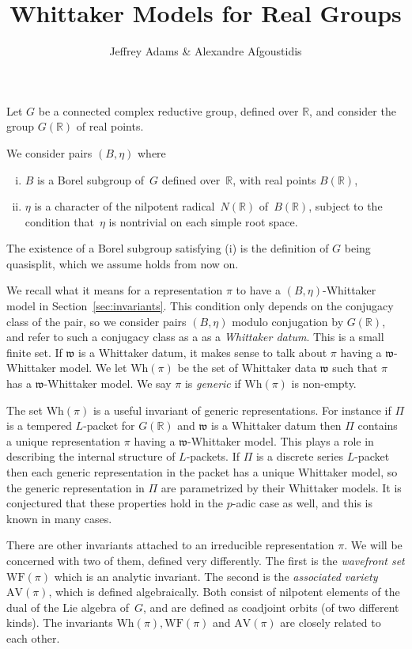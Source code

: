 \documentclass[10pt,leqno]{article}
\newcommand{\R}{\mathbb R}
\newcommand{\w}{\mathfrak w}
\newcommand{\AV}{\mathrm{AV}}
\newcommand{\Wh}{\mathrm{Wh}}
\newcommand{\WF}{\mathrm{WF}}
\begin{document}
\title{Whittaker Models for Real Groups}
\author{Jeffrey Adams \& Alexandre Afgoustidis}
\maketitle

Let $G$ be a connected complex reductive group, defined over $\R$, and consider the group $G(\R)$ of real points. 

We consider pairs $(B,\eta)$ where 
\begin{enumerate}[(i)]
\item $B$ is a Borel subgroup of~$G$ defined over~$\R$, with real points $B(\R)$,
\item $\eta$ is a character of the nilpotent radical~$N(\R)$ of~$B(\R)$, subject to the condition that~$\eta$ is nontrivial on each simple root space.
\end{enumerate}
The existence of a Borel subgroup satisfying (i) is the definition of $G$ being quasisplit, which we assume holds from now on.

We recall what it means for a representation $\pi$ to have a $(B,\eta)$-Whittaker model in Section~\ref{sec:invariants}.
This condition only depends on the conjugacy class of the pair, 
so we  consider pairs $(B,\eta)$ modulo conjugation by $G(\R)$, and refer to such a conjugacy class as a 
as a {\it Whittaker datum}.
This is a small finite set.
If $\w$ is a Whittaker datum, it makes sense to talk about $\pi$ having a $\w$-Whittaker model. We let $\Wh(\pi)$  be the set of
Whittaker data $\w$ such that $\pi$ has a $\w$-Whittaker model. We say $\pi$ is {\it generic} if $\Wh(\pi)$ is non-empty.

The set $\Wh(\pi)$ is
a useful invariant of generic representations.
For instance if $\Pi$ is a tempered $L$-packet for $G(\R)$ and $\w$ is a Whittaker datum then $\Pi$ contains a unique representation $\pi$
having a $\w$-Whittaker model. This plays a role in describing the internal structure of $L$-packets.
If $\Pi$ is a discrete series $L$-packet then each generic representation in the packet has a unique
Whittaker model, so the generic representation in $\Pi$ are parametrized by their Whittaker models.
It is conjectured that these properties hold in the $p$-adic case as well, and this is known in many cases.

There are other invariants attached to an
irreducible representation $\pi$.  We will be concerned with two of
them, defined very differently. The first is the \emph{wavefront set} $\WF(\pi)$
which is an analytic invariant.
The second is the \emph{associated variety} $\AV(\pi)$, which is
defined  algebraically.
Both consist of nilpotent elements of the dual of the Lie algebra of~$G$, and are defined as
coadjoint orbits (of two different kinds).
The invariants $\Wh(\pi), \WF(\pi)$ and $\AV(\pi)$ are closely related to each other.
\end{document}
